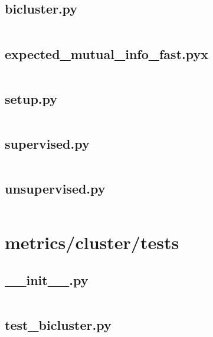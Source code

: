\documentclass{article}
\begin{document}
\subsection{bicluster.py}
\inputminted{python}{/home/dufferzafar/dev/@clones/scikit-learn/sklearn/metrics/cluster/bicluster.py}
\newpage

\subsection{expected\_mutual\_info\_fast.pyx}
\inputminted{cython}{/home/dufferzafar/dev/@clones/scikit-learn/sklearn/metrics/cluster/expected_mutual_info_fast.pyx}
\newpage

\subsection{setup.py}
\inputminted{python}{/home/dufferzafar/dev/@clones/scikit-learn/sklearn/metrics/cluster/setup.py}
\newpage

\subsection{supervised.py}
\inputminted{python}{/home/dufferzafar/dev/@clones/scikit-learn/sklearn/metrics/cluster/supervised.py}
\newpage

\subsection{unsupervised.py}
\inputminted{python}{/home/dufferzafar/dev/@clones/scikit-learn/sklearn/metrics/cluster/unsupervised.py}
\newpage

\section{metrics/cluster/tests}

\subsection{\_\_init\_\_.py}
\inputminted{python}{/home/dufferzafar/dev/@clones/scikit-learn/sklearn/metrics/cluster/tests/__init__.py}
\newpage

\subsection{test\_bicluster.py}
\inputminted{python}{/home/dufferzafar/dev/@clones/scikit-learn/sklearn/metrics/cluster/tests/test_bicluster.py}
\newpage
\end{document}
